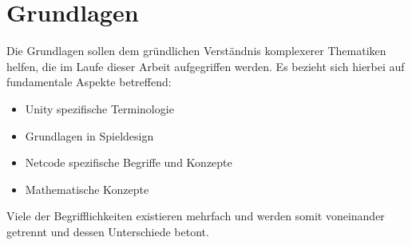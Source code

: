 \chapter{Grundlagen}
Die Grundlagen sollen dem gründlichen Verständnis komplexerer Thematiken helfen, die im Laufe dieser Arbeit aufgegriffen werden.
Es bezieht sich hierbei auf fundamentale Aspekte betreffend:
\begin{itemize}
    \item{Unity spezifische Terminologie}
    \item{Grundlagen in Spieldesign}
    \item{Netcode spezifische Begriffe und Konzepte}
    \item{Mathematische Konzepte}
\end{itemize}

Viele der Begrifflichkeiten existieren mehrfach und werden somit voneinander getrennt und dessen Unterschiede betont.
